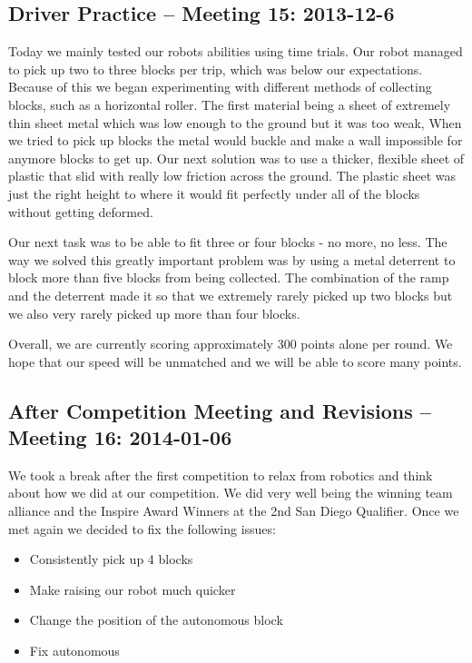 \newpage \subsection{Driver Practice -- Meeting 15: 2013-12-6}
Today we mainly tested our robots abilities using time trials.  Our robot managed to pick up two to three blocks per trip, which was below our expectations.  Because of this we began experimenting with different methods of collecting blocks, such as a horizontal roller. The first material being a sheet of extremely thin sheet metal which was low enough to the ground but it was too weak, When we tried to pick up blocks the metal would buckle and make a wall impossible for anymore blocks to get up.  Our next solution was to use a thicker, flexible sheet of plastic that slid with really low friction across the ground.  The plastic sheet was just the right height to where it would fit perfectly under all of the blocks without getting deformed. 

Our next task was to be able to fit three or four blocks - no more, no less.  The way we solved this greatly important problem was by using a metal deterrent to block more than five blocks from being collected.  The combination of the ramp and the deterrent made it so that we extremely rarely picked up two blocks but we also very rarely picked up more than four blocks.

Overall, we are currently scoring approximately 300 points alone per round. We hope that our speed will be unmatched and we will be able to score many points. 
\newpage \subsection{After Competition Meeting and Revisions -- Meeting 16: 2014-01-06}
We took a break after the first competition to relax from robotics and think about how we did at our competition. We did very well being the winning team alliance and the Inspire Award Winners at the 2nd San Diego Qualifier. Once we met again we decided to fix the following issues: 

\begin{itemize}
\item Consistently pick up 4 blocks
\item Make raising our robot much quicker
\item Change the position of the autonomous block
\item Fix autonomous
\end{itemize}

